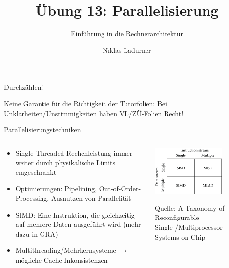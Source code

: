 \documentclass[
  german,            %
  aspectratio=169,    %
]{tumbeamer}
\title{Übung 13: Parallelisierung}
\subtitle{Einführung in die Rechnerarchitektur}
\author{Niklas Ladurner}
\institute{\theChairName\\\theDepartmentName\\\theUniversityName}
\date{\DTMdisplaydate{2024}{1}{26}{-1}}
\begin{document}
\maketitle

\begin{frame}[c]{}{}
  \begin{center}
    \LARGE  Durchzählen!
  \end{center}
\end{frame}

\begin{frame}[c]{}{}
  \begin{center}
    \LARGE  Keine Garantie für die Richtigkeit der Tutorfolien: Bei Unklarheiten/Unstimmigkeiten
    haben VL/ZÜ-Folien Recht!
  \end{center}
\end{frame}

\begin{frame}[fragile, c]{Parallelisierungstechniken}{}
  \begin{columns}[c]
    \begin{column}{0.5\textwidth}
      \begin{itemize}
        \item Single-Threaded Rechenleistung immer weiter durch physikalische Limits eingeschränkt
        \item Optimierungen: Pipelining, Out-of-Order-Processing, Ausnutzen von Parallelität
        \item SIMD: Eine Instruktion, die gleichzeitig auf mehrere Daten ausgeführt wird (mehr dazu in GRA)
        \item Multithreading/Mehrkernsysteme $\rightarrow$ mögliche Cache-Inkonsistenzen
      \end{itemize}
    \end{column}
    \begin{column}{0.5\textwidth}
      \begin{center}
        \includegraphics[width=0.7\textwidth]{w13_flynn.png}
      \end{center}
      \centering
      \tiny{Quelle: A Taxonomy of Reconfigurable Single-/Multiprocessor\\Systems-on-Chip}
    \end{column}
  \end{columns}
\end{frame}
\end{document}
